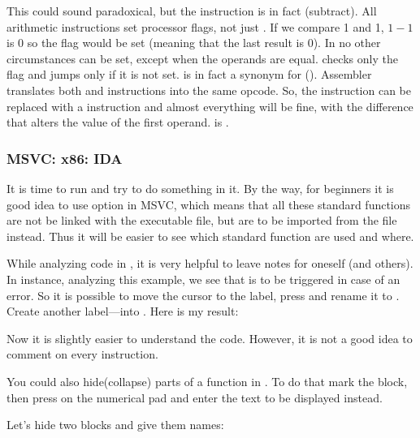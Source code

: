 \label{CMPandSUB}
This could sound paradoxical, but the \CMP instruction is in fact \SUB (subtract).
All arithmetic instructions set processor flags, not just \CMP.
If we compare 1 and 1, $1-1$ is 0 so the \ZF flag would be set (meaning that the last result is 0).
In no other circumstances \ZF can be set, except when the operands are equal.
\JNE checks only the \ZF flag and jumps only if it is not set.  \JNE is in fact a synonym for \JNZ ().
Assembler translates both \JNE and \JNZ instructions into the same opcode.
So, the \CMP instruction can be replaced with a \SUB instruction and almost everything will be fine, with the difference that \SUB alters the value of the first operand.
\CMP is .

\subsubsection{MSVC: x86: IDA}

It is time to run \IDA and try to do something in it.
By the way, for beginners it is good idea to use  option in MSVC, which means that all these
standard functions are not be linked with the executable file, 
but are to be imported from the  file instead.
Thus it will be easier to see which standard function are used and where.

While analyzing code in \IDA, it is very helpful to leave notes for oneself (and others).
In instance, analyzing this example, 
we see that  is to be triggered in case of an error.
So it is possible to move the cursor to the label, press  and rename it to .
Create another label---into .
Here is my result:



Now it is slightly easier to understand the code.
However, it is not a good idea to comment on every instruction.

You could also hide(collapse) parts of a function in \IDA.
To do that mark the block, then press \q{--} on the numerical pad and enter the text to be displayed instead.

Let's hide two blocks and give them names:



